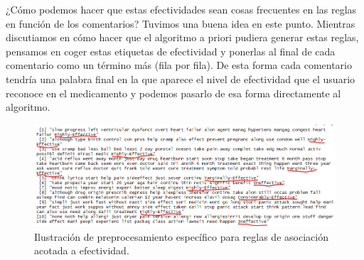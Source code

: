 \documentclass[spanish,]{article}
\newenvironment{Shaded}{\begin{snugshade}}{\end{snugshade}}
\newcommand{\KeywordTok}[1]{\textcolor[rgb]{0.13,0.29,0.53}{\textbf{#1}}}
\newcommand{\DataTypeTok}[1]{\textcolor[rgb]{0.13,0.29,0.53}{#1}}
\newcommand{\DecValTok}[1]{\textcolor[rgb]{0.00,0.00,0.81}{#1}}
\newcommand{\StringTok}[1]{\textcolor[rgb]{0.31,0.60,0.02}{#1}}
\newcommand{\CommentTok}[1]{\textcolor[rgb]{0.56,0.35,0.01}{\textit{#1}}}
\newcommand{\OperatorTok}[1]{\textcolor[rgb]{0.81,0.36,0.00}{\textbf{#1}}}
\newcommand{\NormalTok}[1]{#1}
\begin{document}
¿Cómo podemos hacer que estas efectividades sean cosas frecuentes en las
reglas en función de los comentarios? Tuvimos una buena idea en este
punto. Mientras discutiamos en cómo hacer que el algoritmo a priori
pudiera generar estas reglas, pensamos en coger estas etiquetas de
efectividad y ponerlas al final de cada comentario como un término más
(fila por fila). De esta forma cada comentario tendría una palabra final
en la que aparece el nivel de efectividad que el usuario reconoce en el
medicamento y podemos pasarlo de esa forma directamente al algoritmo.

\begin{Shaded}
\end{Shaded}

\begin{figure}[h]
    \centering
    \includegraphics[width=1\textwidth]{figuras/asociacion/ejemplo_effects_effectiveness.png}
    \caption{Ilustración de preprocesamiento específico para reglas de asociación acotada a efectividad.}
    \label{fig:asociacion:preprocesamientoAsociacion}
\end{figure}
\end{document}
